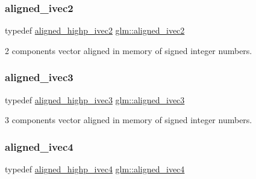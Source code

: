 \subsubsection{\texorpdfstring{aligned\+\_\+ivec2}{aligned\_ivec2}}
{\footnotesize\ttfamily typedef \mbox{\hyperlink{group__gtc__type__aligned_ga34105808a80ef5dabd7807997dfef328}{aligned\+\_\+highp\+\_\+ivec2}} \mbox{\hyperlink{group__gtc__type__aligned_ga2a709e1d21f3aae3f8d6de910f5fdff4}{glm\+::aligned\+\_\+ivec2}}}



2 components vector aligned in memory of signed integer numbers. 

\mbox{\label{group__gtc__type__aligned_gabbf85e492d39baef3a418c15c996ab65}} 
\subsubsection{\texorpdfstring{aligned\+\_\+ivec3}{aligned\_ivec3}}
{\footnotesize\ttfamily typedef \mbox{\hyperlink{group__gtc__type__aligned_gaa469d8bf0cb9ae640c943d847ec48f95}{aligned\+\_\+highp\+\_\+ivec3}} \mbox{\hyperlink{group__gtc__type__aligned_gabbf85e492d39baef3a418c15c996ab65}{glm\+::aligned\+\_\+ivec3}}}



3 components vector aligned in memory of signed integer numbers. 

\mbox{\label{group__gtc__type__aligned_gaa33169a30c7d22a8648f20b4534f635f}} 
\subsubsection{\texorpdfstring{aligned\+\_\+ivec4}{aligned\_ivec4}}
{\footnotesize\ttfamily typedef \mbox{\hyperlink{group__gtc__type__aligned_gabbac4883efc1760f4efb450753794f2d}{aligned\+\_\+highp\+\_\+ivec4}} \mbox{\hyperlink{group__gtc__type__aligned_gaa33169a30c7d22a8648f20b4534f635f}{glm\+::aligned\+\_\+ivec4}}}



